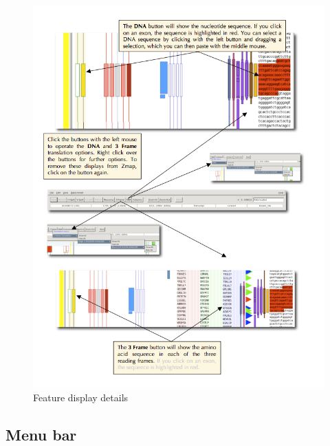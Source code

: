 \documentclass[letterpaper]{article}
\begin{document}
\begin{figure}
\centering
\color[rgb]{0.30980393,0.5058824,0.7411765}
\includegraphics[width=15.231cm]{img_feature_display_details.png}
\caption{Feature display details}
\label{img_feature_display_details}
\end{figure}


\subsection{Menu bar}
\end{document}
